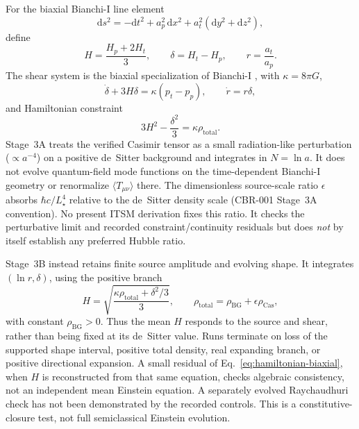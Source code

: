 \documentclass[aps,prd,reprint,superscriptaddress,nofootinbib,floatfix,showkeys]{revtex4-2}
\newcommand{\Ht}{H_{t}}
\newcommand{\Hp}{H_{p}}
\begin{document}
For the biaxial Bianchi-I line element
\begin{equation}
 \mathrm{d}s^2=-\mathrm{d}t^2+a_p^2\,\mathrm{d}x^2+a_t^2(\mathrm{d}y^2+\mathrm{d}z^2),
\end{equation}
define
\begin{equation}
 H=\frac{\Hp+2\Ht}{3},\qquad
 \delta=\Ht-\Hp,\qquad
 r=\frac{a_t}{a_p}.
\end{equation}
The shear system is the biaxial specialization of Bianchi-I
\cite{ellismaccallum1969}, with \(\kappa=8\pi G\),
\begin{equation}
 \dot\delta+3H\delta=\kappa(p_t-p_p),\qquad
 \dot r=r\delta,
 \label{eq:shear-system}
\end{equation}
and Hamiltonian constraint
\begin{equation}
 3H^2-\frac{\delta^2}{3}=\kappa\rho_{\mathrm{total}}.
 \label{eq:hamiltonian-biaxial}
\end{equation}
Stage~3A treats the verified Casimir tensor as a small radiation-like
perturbation (\(\propto a^{-4}\)) on a positive de~Sitter background and
integrates in \(N=\ln a\).
It does not evolve quantum-field mode functions on the time-dependent
Bianchi-I geometry or renormalize \(\langle T_{\mu\nu}\rangle\) there.
The dimensionless source-scale ratio \(\epsilon\) absorbs
\(\hbar c/L_\star^4\) relative to the de~Sitter density scale (CBR-001
Stage~3A convention).  No present ITSM derivation fixes this ratio.
It checks the perturbative limit and recorded constraint/continuity residuals
but does \emph{not} by itself establish any preferred Hubble ratio.

Stage~3B instead retains finite source amplitude and evolving shape. It
integrates \((\ln r,\delta)\), using the positive branch
\begin{equation}
 H=\sqrt{\frac{\kappa\rho_{\mathrm{total}}+\delta^2/3}{3}},\qquad
 \rho_{\mathrm{total}}=\rho_{\mathrm{BG}}+\epsilon\rho_{\mathrm{Cas}},
 \label{eq:stage3b-H}
\end{equation}
with constant \(\rho_{\mathrm{BG}}>0\). Thus the mean \(H\) responds to
the source and shear, rather than being fixed at its de~Sitter value. Runs
terminate on loss of the supported shape interval, positive total density,
real expanding branch, or positive directional expansion. A small residual
of Eq.~\eqref{eq:hamiltonian-biaxial}, when \(H\) is reconstructed from that
same equation, checks algebraic consistency, not an independent mean Einstein
equation. A separately evolved Raychaudhuri check has not been demonstrated
by the recorded controls. This is a constitutive-closure test, not full
semiclassical Einstein evolution.
\end{document}
